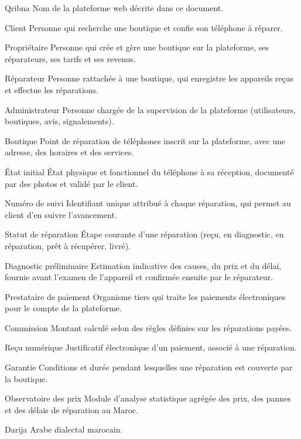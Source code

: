 

\begin{cdcdefinitions}
  \item[Qribna] Nom de la plateforme web décrite dans ce document.
  \item[Client] Personne qui recherche une boutique et confie son téléphone à réparer.
  \item[Propriétaire] Personne qui crée et gère une boutique sur la plateforme, ses réparateurs, ses tarifs et ses revenus.
  \item[Réparateur] Personne rattachée à une boutique, qui enregistre les appareils reçus et effectue les réparations.
  \item[Administrateur] Personne chargée de la supervision de la plateforme (utilisateurs, boutiques, avis, signalements).
  \item[Boutique] Point de réparation de téléphones inscrit sur la plateforme, avec une adresse, des horaires et des services.
  \item[État initial] État physique et fonctionnel du téléphone à sa réception, documenté par des photos et validé par le client.
  \item[Numéro de suivi] Identifiant unique attribué à chaque réparation, qui permet au client d’en suivre l’avancement.
  \item[Statut de réparation] Étape courante d’une réparation (reçu, en diagnostic, en réparation, prêt à récupérer, livré).
  \item[Diagnostic préliminaire] Estimation indicative des causes, du prix et du délai, fournie avant l’examen de l’appareil et confirmée ensuite par le réparateur.
  \item[Prestataire de paiement] Organisme tiers qui traite les paiements électroniques pour le compte de la plateforme.
  \item[Commission] Montant calculé selon des règles définies sur les réparations payées.
  \item[Reçu numérique] Justificatif électronique d’un paiement, associé à une réparation.
  \item[Garantie] Conditions et durée pendant lesquelles une réparation est couverte par la boutique.
  \item[Observatoire des prix] Module d’analyse statistique agrégée des prix, des pannes et des délais de réparation au Maroc.
  \item[Darija] Arabe dialectal marocain.
\end{cdcdefinitions}

